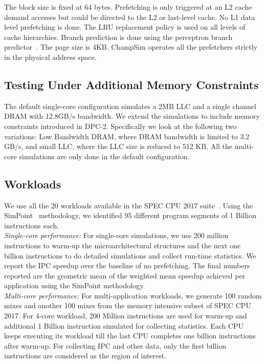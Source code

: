 The block size is fixed at 64 bytes. Prefetching is only triggered at an L2
cache demand accesses but could be directed to the L2 or last-level cache. No
L1 data level prefetching is done. The LRU replacement policy is used on all
levels of cache hierarchies. Branch prediction is done using the perceptron
branch predictor~\cite{PerceptronPredictor}. The page size is 4KB. 
ChampSim operates all the prefetchers strictly in the physical address space.

\subsection{Testing Under Additional Memory Constraints}
\label{Method-AdditionalMem}
The default single-core configuration simulates a 2MB LLC and a single channel
DRAM with 12.8GB/s bandwidth. We extend the simulations to include memory
constraints introduced in DPC-2. Specifically we look at the following two
variations: Low Bandwidth DRAM, where DRAM bandwidth is limited to 3.2 GB/s,
and small LLC, where the LLC size is reduced to 512 KB. All the multi-core
simulations are only done in the default configuration.

\subsection{Workloads}
\label{Method-Workloads}

We use all the 20 workloads available in the SPEC CPU 2017 suite~\cite{SPEC 2017}. Using the SimPoint~\cite{SimPoint}
methodology, we identified 95 different program segments of 1 Billion
instructions each.\\
%
\noindent \textit{Single-core performance:} For single-core simulations, we use 200
million instructions to warm-up the microarchitectural structures and the next
one billion instructions to do detailed simulations and collect run-time
statistics. We report the IPC speedup over the baseline of no prefetching.
The final numbers reported are the geometric mean of the weighted mean speedup 
achieved per application using the SimPoint methodology.\\
%
\noindent \textit{Multi-core performance:} For multi-application workloads, we generate
100 random mixes and another 100 mixes from the memory intensive subset of
SPEC CPU 2017. For 4-core workload, 200 Million instructions are used for warm-up
and additional 1 Billion instruction simulated for collecting statistics.
Each CPU keeps executing its workload till the last CPU completes one billion
instructions after warm-up. For collecting IPC and other data, only the first
billion instructions are considered as the region of interest.

